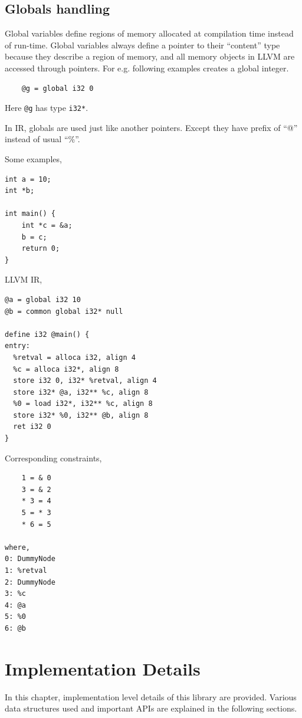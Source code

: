 \documentclass[a4paper,12pt]{report}
\begin{document}
\section{Globals handling}
Global variables define regions of memory allocated at compilation time instead
of run-time. Global variables always define a pointer to their ``content'' type
because they describe a region of memory, and all memory objects in LLVM are
accessed through pointers. For e.g. following examples creates a global integer.

\begin{verbatim}
    @g = global i32 0 
\end{verbatim}


\noindent
Here \texttt{@g} has type \texttt{i32*}.

In IR, globals are used just like another pointers. Except they have prefix of
``@'' instead of usual ``\%''.

\noindent
Some examples,
\begin{verbatim}
int a = 10;
int *b;

int main() {
    int *c = &a;
    b = c;
    return 0;
}
\end{verbatim}

\noindent
LLVM IR,

\begin{verbatim}
@a = global i32 10
@b = common global i32* null

define i32 @main() {
entry:
  %retval = alloca i32, align 4
  %c = alloca i32*, align 8
  store i32 0, i32* %retval, align 4
  store i32* @a, i32** %c, align 8
  %0 = load i32*, i32** %c, align 8
  store i32* %0, i32** @b, align 8
  ret i32 0
}
\end{verbatim}

\noindent
Corresponding constraints,

\begin{lstlisting}
    1 = & 0
    3 = & 2
    * 3 = 4
    5 = * 3
    * 6 = 5

where,
0: DummyNode
1: %retval
2: DummyNode
3: %c
4: @a
5: %0
6: @b
\end{lstlisting}

\chapter{Implementation Details}
In this chapter, implementation level details of this library are provided. Various 
data structures used and important APIs are explained in the following sections.
\end{document}
